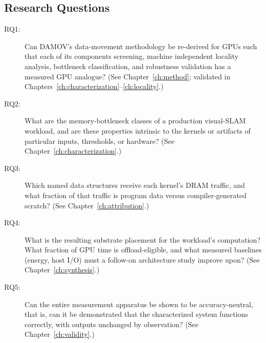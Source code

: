 \subsection{Research Questions}
\begin{description}
\item[RQ1:] Can DAMOV's data-movement methodology be re-derived for GPUs such that each of its components screening, machine independent locality analysis, bottleneck classification, and robustness validation has a measured GPU analogue? (See Chapter~\ref{ch:method}; validated in Chapters~\ref{ch:characterization}--\ref{ch:locality}.)

\item[RQ2:] What are the memory-bottleneck classes of a production visual-SLAM workload, and are these properties intrinsic to the kernels or artifacts of particular inputs, thresholds, or hardware? (See Chapter~\ref{ch:characterization}.)

\item[RQ3:] Which named data structures receive each kernel's DRAM traffic, and what fraction of that traffic is program data versus compiler-generated scratch? (See Chapter~\ref{ch:attribution}.)    

\item[RQ4:] What is the resulting substrate placement for the workload's computation? What fraction of GPU time is offload-eligible, and what measured baselines (energy, host I/O) must a follow-on architecture study improve upon? (See Chapter~\ref{ch:synthesis}.)

\item[RQ5:] Can the entire measurement apparatus be shown to be accuracy-neutral, that is, can it be demonstrated that the characterized system functions correctly, with outputs unchanged by observation? (See Chapter~\ref{ch:validity}.)\end{description}

